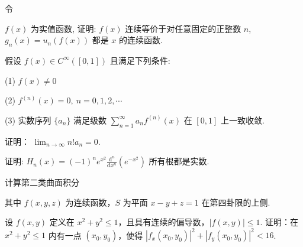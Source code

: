 令\par
\nopagebreak[4]
$f(x)$ 为实值函数, 证明: $f(x)$ 连续等价于对任意固定的正整数 $n$, $g_{n}(x) = u_{n}(f(x))$ 都是 $x$ 的连续函数.\par
假设 $f(x) \in C^{\infty}([0,1])$ 且满足下列条件:\par
(1) $f(x)\neq 0$\par
(2)  $f^{(n)}(x)=0,\ n=0,1,2,\cdots$\par
(3) 实数序列 $\{a_{n}\}$ 满足级数 $\sum_{n=1}^{\infty} a_{n} f^{(n)}(x)$ 在 $[0,1]$ 上一致收敛.\par
证明： $\lim_{n\to \infty}n!a_n = 0.$\par
证明: $H_{n}(x) = (-1)^{n} e^{x^{2}} \frac{\mathrm{d}^{n}}{\mathrm{d} x^{n}} (e^{-x^{2}})$ 所有根都是实数.\par
\par{}
计算第二类曲面积分\par
\nopagebreak[4]
其中 $f(x,y,z)$ 为连续函数，$S$ 为平面 $x - y + z = 1$ 在第四卦限的上侧.\par
设 $f(x, y)$ 定义在 $x^2 + y^2 \leq 1$，且具有连续的偏导数，$|f(x, y)| \leq 1$. 证明：在 $x^2 + y^2 \leq 1$ 内有一点 $(x_0, y_0)$，使得 $|f_x(x_0, y_0)|^2 + |f_y(x_0, y_0)|^2 < 16$.\par
